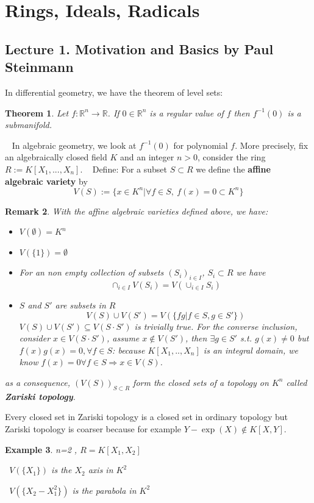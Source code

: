 \documentclass[11pt]{article}
\newtheorem{thm}{Theorem}[section]
\newtheorem{rmk}[thm]{Remark}
\newtheorem{ex}[thm]{Example}
\newcommand{\reals}{\mathbb R}
\newcommand{\Lrta}{\Longrightarrow}
\begin{document}
\section{Rings, Ideals, Radicals}
\subsection{Lecture 1. Motivation and Basics by Paul Steinmann}
In differential geometry, we have the theorem of level sets:
\begin{thm}
Let $f:\reals^n \rightarrow \reals$.
If $0 \in \reals^n$ is a regular value of $f$ then $f^{-1}(0)$ is a submanifold.
\end{thm} 
 
In algebraic geometry, we look at $f^{-1}(0)$ for polynomial $f$.
More precisely, fix an algebraically closed field $K$ and an integer $n>0$, consider the ring $R:=K[X_1,...,X_n]$.
 
Define: For a subset $S\subset R$ we define the \textbf{affine algebraic variety} by
\begin{equation}
V(S):=\{x\in K^n| \forall f \in S,\ f(x)=0\subset K^n\}
\end{equation}
\begin{rmk}
With the affine algebraic varieties defined above, we have:
\begin{itemize}
\item $V(\emptyset)=K^n$
\item $ V(\{1\})=\emptyset$
\item   For an non empty collection of subsets $(S_i)_{i\in I}$, $S_i\subset R$ we have 
\begin{equation*}
    \cap_{i\in I}V(S_i)=V(\cup_{i\in I} S_i)
\end{equation*}
\item $S$ and $S'$ are subsets in $R$
\begin{equation*}
    V(S)\cup V(S')=V(\{fg| f\in S, g\in S'\})
\end{equation*}
$V(S)\cup V(S')\subseteq V(S\cdot S')$ is trivially true. For the converse inclusion, consider $x\in V(S\cdot S')$, assume $x\notin V(S')$, then $\exists g\in S'$ s.t. $g(x)\neq 0$ but $f(x)g(x)=0,\forall f\in S$: because $K[X_1,..,X_n]$ is an integral domain, we know $f(x)=0\forall f\in S\Lrta x\in V(S)$.
\end{itemize}
as a consequence, 
    $(V(S))_{S\subset R}$ form the closed sets of a topology on $K^n$ called \textbf{Zariski topology}.
\end{rmk}
Every closed set in Zariski topology is a closed set in ordinary topology but Zariski topology is coarser because for example $Y-\exp(X)\notin K[X,Y]$.
\begin{ex}
n=2 , $R=K[X_1,X_2]$

 $V(\{X_1\})$ is the $X_2$ axis in $K^2$

 $V(\{X_2-X_1^2\})$ is the parabola in $K^2$
\end{ex}
\end{document}
